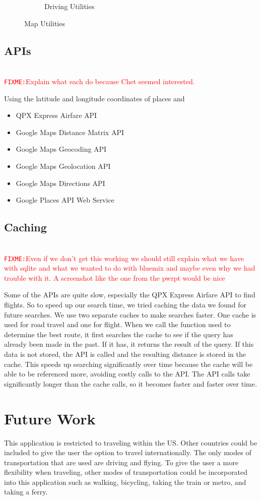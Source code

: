 \documentclass[11pt]{article}
\newcommand{\FIXME}[1]{ \ \\ \hspace* {-1.5 cm}
  \textcolor{red}{\texttt{FIXME:}#1} \medskip\par}
\begin{document}
\begin{figure}
\begin{subfigure}{.6\textwidth}
  \caption{Driving Utilities}
  \label{fig:drivuml}
\end{subfigure}
\caption{Map Utilities}
\label{fig:util}
\end{figure}

\subsection{APIs}

\FIXME{Explain what each do because Chet seemed interested.}

Using the latitude and longitude coordinates of places and 

\begin{itemize}
\item QPX Express Airfare API
\item Google Maps Distance Matrix API
\item Google Maps Geocoding API
\item Google Maps Geolocation API
\item Google Maps Directions API
\item Google Places API Web Service
\end{itemize}

\subsection{Caching}
\FIXME{Even if we don't get this working we should still explain what we have with sqlite and what we wanted to do with bluemix and maybe even why we had trouble with it. A screenshot like the one from the pwrpt would be nice}

Some of the APIs are quite slow, especially the QPX Express Airfare API to find flights. So to speed up our search time, we tried caching the data we found for future searches.
We use two separate caches to make searches faster. One cache is used for road travel and one for flight. When we call the function used to determine the best route, it first searches the cache to see if the query has already been made in the past. If it has, it returns the result of the query. If this data is not stored, the API is called and the resulting distance is stored in the cache. This speeds up searching significantly over time because the cache will be able to be referenced more, avoiding costly calls to the API. The API calls take significantly longer than the cache calls, so it becomes faster and faster over time. 

\section{Future Work}
This application is restricted to traveling within the US. Other countries could be included to give the user the option to travel internationally. The only modes of transportation that are used are driving and flying. To give the user a more flexibility when traveling, other modes of transportation could be incorporated into this application such as walking, bicycling, taking the train or metro, and taking a ferry.
\end{document}
